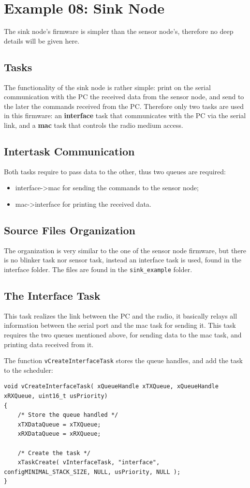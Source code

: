 \documentclass[11pt]{report}
\begin{document}
\section{Example 08: Sink Node}
The sink node's firmware is simpler than the sensor node's, therefore no deep details will be given here.

\subsection{Tasks}
The functionality of the sink node is rather simple: print on the serial communication with the PC the received data from the sensor node, and send to the later the commands received from the PC.
Therefore only two tasks are used in this firmware: an \textbf{interface} task that communicates with the PC via the serial link, and a \textbf{mac} task that controls the radio medium access.

\subsection{Intertask Communication}
Both tasks require to pass data to the other, thus two queues are required:
\begin{itemize}
	\item interface-\textgreater mac for sending the commands to the sensor node;
	\item mac-\textgreater interface for printing the received data.
\end{itemize}

\subsection{Source Files Organization}
The organization is very similar to the one of the sensor node firmware, but there is no blinker task nor sensor task, instead an interface task is used, found in the interface folder. The files are found in the \verb$sink_example$ folder.

\subsection{The Interface Task}
This task realizes the link between the PC and the radio, it basically relays all information between the serial port and the mac task for sending it.
This task requires the two queues mentioned above, for sending data to the mac task, and printing data received from it.

The function \verb$vCreateInterfaceTask$ stores the queue handles, and add the task to the scheduler:
\begin{verbatim}
void vCreateInterfaceTask( xQueueHandle xTXQueue, xQueueHandle xRXQueue, uint16_t usPriority)
{
    /* Store the queue handled */
    xTXDataQueue = xTXQueue;
    xRXDataQueue = xRXQueue;
        
    /* Create the task */
    xTaskCreate( vInterfaceTask, "interface", configMINIMAL_STACK_SIZE, NULL, usPriority, NULL );
}
\end{verbatim}
\end{document}
